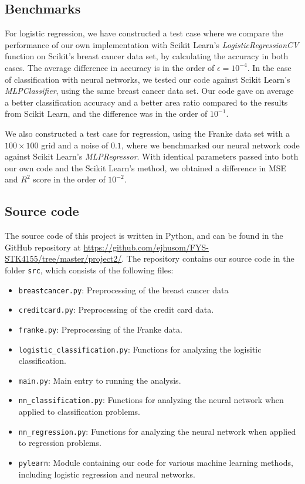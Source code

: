 \subsection{Benchmarks}
For logistic regression, we have constructed a test case where we compare the performance of our own implementation with Scikit Learn's \textit{LogisticRegressionCV} function on Scikit's breast cancer data set, by calculating the accuracy in both cases. The average difference in accuracy is in the order of $\epsilon = 10^{-4}$. In the case of classification with neural networks, we tested our code against Scikit Learn's \textit{MLPClassifier}, using the same breast cancer data set. Our code gave on average a better classification accuracy and a better area ratio compared to the results from Scikit Learn, and the difference was in the order of $10^{-1}$.

We also constructed a test case for regression, using the Franke data set with a $100 \times 100$ grid and a noise of $0.1$, where we benchmarked our neural network code against Scikit Learn's \textit{MLPRegressor}. With identical parameters passed into both our own code and the Scikit Learn's method, we obtained a difference in MSE and $R^2$ score in the order of $10^{-2}$.


\subsection{Source code}

The source code of this project is written in Python, and can be found in the GitHub repository at \url{https://github.com/ejhusom/FYS-STK4155/tree/master/project2/}. The repository contains our source code in the folder \texttt{src}, which consists of the following files:

\begin{itemize}
    \item \texttt{breastcancer.py}: Preprocessing of the breast cancer data
    \item \texttt{creditcard.py}: Preprocessing of the credit card data.
    \item \texttt{franke.py}: Preprocessing of the Franke data.
    \item \texttt{logistic\_classification.py}: Functions for analyzing the
        logisitic classification.
    \item \texttt{main.py}: Main entry to running the analysis.
    \item \texttt{nn\_classification.py}: Functions for analyzing the neural network when applied to classification problems.
    \item \texttt{nn\_regression.py}: Functions for analyzing the neural network when applied to regression problems.
    \item \texttt{pylearn}: Module containing our code for various machine learning methods, including logistic regression and neural networks.
\end{itemize}


